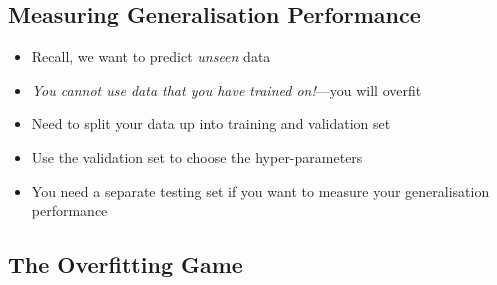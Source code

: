 
\begin{slide}
\section{Measuring Generalisation Performance}

\begin{PauseHighLight}
  \begin{itemize}
  \item Recall, we want to predict \emph{unseen} data\pause
  \item \emph{You cannot use data that you have trained
      on!}\pause---you will overfit\pauseb
  \item Need to split your data up into training and validation
    set\pause
  \item Use the validation set to choose the hyper-parameters\pause
  \item You need a separate testing set if you want to measure your
    generalisation performance\pause
  \end{itemize}
\end{PauseHighLight}

\end{slide}


\begin{slide}
\section[-2]{The Overfitting Game}

\pb\pause{}
\begin{center}
  \pause
\end{center}

\end{slide}




